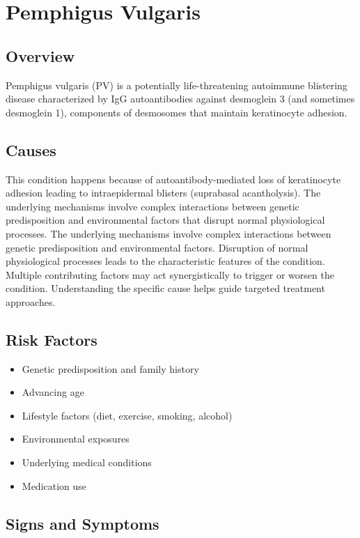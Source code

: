 \chapter{Pemphigus Vulgaris}
\label{sec:Pemphigus Vulgaris}

\section{Overview}
Pemphigus vulgaris (PV) is a potentially life-threatening autoimmune blistering disease characterized by IgG autoantibodies against desmoglein 3 (and sometimes desmoglein 1), components of desmosomes that maintain keratinocyte adhesion.
\section{Causes}
This condition happens because of autoantibody-mediated loss of keratinocyte adhesion leading to intraepidermal blisters (suprabasal acantholysis). The underlying mechanisms involve complex interactions between genetic predisposition and environmental factors that disrupt normal physiological processes. The underlying mechanisms involve complex interactions between genetic predisposition and environmental factors. Disruption of normal physiological processes leads to the characteristic features of the condition. Multiple contributing factors may act synergistically to trigger or worsen the condition. Understanding the specific cause helps guide targeted treatment approaches.
\section{Risk Factors}


\begin{itemize}[noitemsep]
  \item Genetic predisposition and family history
  \item Advancing age
  \item Lifestyle factors (diet, exercise, smoking, alcohol)
  \item Environmental exposures
  \item Underlying medical conditions
  \item Medication use
\end{itemize}
\section{Signs and Symptoms}

